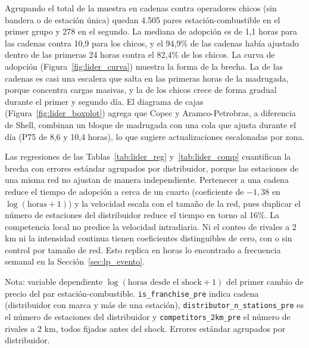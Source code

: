 \documentclass[11pt]{article}
\begin{document}
Agrupando el total de la muestra en cadenas contra operadores chicos (sin
bandera o de estación única) quedan 4.505 pares estación-combustible en el
primer grupo y 278 en el segundo. La mediana de adopción es de 1,1 horas
para las cadenas contra 10,9 para los chicos, y el 94,9\% de las cadenas
había ajustado dentro de las primeras 24 horas contra el 82,4\% de los
chicos. La curva de adopción (Figura~\ref{fig:lider_curva}) muestra la forma
de la brecha. La de las cadenas es casi una escalera que salta en las
primeras horas de la madrugada, porque concentra cargas masivas, y la de los
chicos crece de forma gradual durante el primer y segundo día. El diagrama
de cajas (Figura~\ref{fig:lider_boxplot}) agrega que Copec y
Aramco-Petrobras, a diferencia de Shell, combinan un bloque de madrugada con
una cola que ajusta durante el día (P75 de 8,6 y 10,4 horas), lo que sugiere
actualizaciones escalonadas por zona.

Las regresiones de las Tablas~\ref{tab:lider_reg} y~\ref{tab:lider_comp}
cuantifican la brecha con errores estándar agrupados por distribuidor,
porque las estaciones de una misma red no ajustan de manera independiente.
Pertenecer a una cadena reduce el tiempo de adopción a cerca de un cuarto
(coeficiente de $-1{,}38$ en $\log(\text{horas}+1)$) y la velocidad escala
con el tamaño de la red, pues duplicar el número de estaciones del
distribuidor reduce el tiempo en torno al 16\%. La competencia local no
predice la velocidad intradiaria. Ni el conteo de rivales a 2 km ni la
intensidad continua tienen coeficientes distinguibles de cero, con o sin
control por tamaño de red. Esto replica en horas lo encontrado a frecuencia
semanal en la Sección~\ref{sec:lp_evento}.

\begin{table}[htbp]
\centering
\caption{Velocidad de adopción: cadena contra operador chico y tamaño de
red.}
\label{tab:lider_reg}


\medskip
\begin{minipage}{0.85\textwidth}
\footnotesize
Nota: variable dependiente $\log(\text{horas desde el shock} + 1)$ del
primer cambio de precio del par estación-combustible.
\texttt{is\_franchise\_pre} indica cadena (distribuidor con marca y más de
una estación), \texttt{distributor\_n\_stations\_pre} es el número de
estaciones del distribuidor y \texttt{competitors\_2km\_pre} el número de
rivales a 2 km, todos fijados antes del shock. Errores estándar agrupados
por distribuidor.
\end{minipage}
\end{table}
\end{document}
